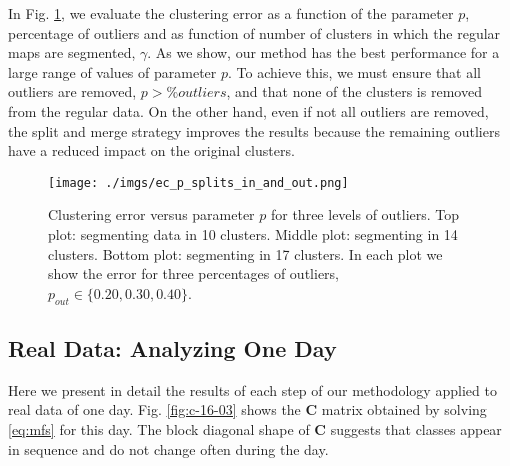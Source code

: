 In Fig. \ref{fig:ec_p_splits}, we evaluate the clustering error as a function of the parameter $p$, percentage of outliers and as function of number of clusters in which the regular maps are segmented, $\gamma$. 
%
As we show, our method has the best performance for a large range of values of parameter $p$. 
To achieve this, we must ensure that all outliers are removed, $p > \%outliers$, and that none of the clusters is removed from the regular data.
%
On the other hand, even if not all outliers are removed, the split and merge strategy improves the results because the remaining outliers have a reduced impact on the original clusters. 
%
\begin{figure}[bht]
\centering
\texttt{[image: ./imgs/ec\_p\_splits\_in\_and\_out.png]}
\caption{Clustering error versus parameter $p$ for three levels of outliers. Top plot: segmenting data in 10 clusters. 
Middle plot: segmenting in 14 clusters. Bottom plot: segmenting in 17 clusters. In each plot we show the error for three percentages of outliers, $p_{out} \in \{0.20, 0.30, 0.40\}$.}
\label{fig:ec_p_splits}
\end{figure}
%

%
\subsection{Real Data: Analyzing One Day}
%
\label{sec:one-day}
%
Here we present in detail the results of each step of our methodology applied to real data of one day. Fig. \ref{fig:c-16-03} shows the $\mathbf{C}$ matrix obtained by solving \eqref{eq:mfs} for this day.
The block diagonal shape of $\mathbf{C}$ suggests that classes appear in sequence and do not change often during the day.


